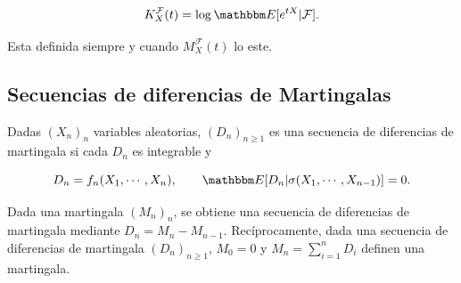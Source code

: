 \begin{definition}

\begin{equation} \label{eq:gencumulantescond}
    K_X^\mathcal{F}(t) = \log\E{e^{tX}|\mathcal{F}}.
\end{equation}

Esta definida siempre y cuando \(M_X^\mathcal{F}(t)\) lo este.
\end{definition}

\subsection{Secuencias de diferencias de Martingalas}

\begin{definition}
    Dadas \((X_n)_n\) variables aleatorias, \((D_n)_{n\geq1}\) es una secuencia de diferencias de martingala si cada \(D_n\) es integrable y

    \begin{equation}
        D_n = f_n(X_1,\cdots,X_n), \qquad \E{D_n|\sigma(X_1,\cdots,X_{n-1})} = 0.
    \end{equation}
\end{definition}

\begin{observation}
Dada una martingala \((M_n)_n\), se obtiene una secuencia de diferencias de martingala mediante \(D_n = M_n - M_{n-1}\). Recíprocamente, dada una secuencia de diferencias de martingala \((D_n)_{n\geq1}\), \(M_0 = 0\) y \(M_n = \sum_{i=1}^n D_i\) definen una martingala.
\end{observation}
